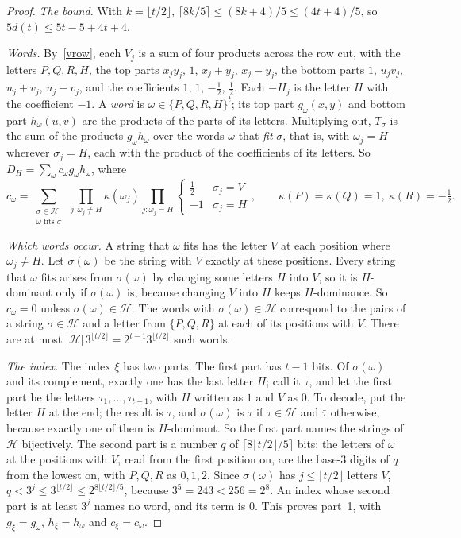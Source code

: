 \documentclass[11pt]{article}
\newcommand{\Hs}{\mathcal H}
\begin{document}
\begin{proof}
\emph{The bound.} With $k=\lfloor t/2\rfloor$, $\lceil8k/5\rceil\le(8k+4)/5\le(4t+4)/5$, so $5d(t)\le5t-5+4t+4$.

\emph{Words.} By~\eqref{vrow}, each $V_j$ is a sum of four products across the row cut, with the letters $P,Q,R,H$, the top parts $x_jy_j$, $1$, $x_j+y_j$, $x_j-y_j$, the bottom parts $1$, $u_jv_j$, $u_j+v_j$, $u_j-v_j$, and the coefficients $1$, $1$, $-\frac12$, $\frac12$. Each $-H_j$ is the letter $H$ with the coefficient $-1$. A \emph{word} is $\omega\in\{P,Q,R,H\}^t$; its top part $g_\omega(x,y)$ and bottom part $h_\omega(u,v)$ are the products of the parts of its letters. Multiplying out, $T_\sigma$ is the sum of the products $g_\omega h_\omega$ over the words $\omega$ that \emph{fit} $\sigma$, that is, with $\omega_j=H$ wherever $\sigma_j=H$, each with the product of the coefficients of its letters. So $D_H=\sum_\omega c_\omega g_\omega h_\omega$, where
\[
c_\omega=\sum_{\substack{\sigma\in\Hs\\\omega\text{ fits }\sigma}}\ \prod_{j:\omega_j\ne H}\kappa(\omega_j)\prod_{j:\omega_j=H}\begin{cases}\frac12&\sigma_j=V\\-1&\sigma_j=H\end{cases},\qquad\kappa(P)=\kappa(Q)=1,\ \kappa(R)=-\tfrac12 .
\]

\emph{Which words occur.} A string that $\omega$ fits has the letter $V$ at each position where $\omega_j\ne H$. Let $\sigma(\omega)$ be the string with $V$ exactly at these positions. Every string that $\omega$ fits arises from $\sigma(\omega)$ by changing some letters $H$ into $V$, so it is $H$-dominant only if $\sigma(\omega)$ is, because changing $V$ into $H$ keeps $H$-dominance. So $c_\omega=0$ unless $\sigma(\omega)\in\Hs$. The words with $\sigma(\omega)\in\Hs$ correspond to the pairs of a string $\sigma\in\Hs$ and a letter from $\{P,Q,R\}$ at each of its positions with $V$. There are at most $|\Hs|\,3^{\lfloor t/2\rfloor}=2^{t-1}3^{\lfloor t/2\rfloor}$ such words.

\emph{The index.} The index $\xi$ has two parts. The first part has $t-1$ bits. Of $\sigma(\omega)$ and its complement, exactly one has the last letter $H$; call it $\tau$, and let the first part be the letters $\tau_1,\dots,\tau_{t-1}$, with $H$ written as $1$ and $V$ as $0$. To decode, put the letter $H$ at the end; the result is $\tau$, and $\sigma(\omega)$ is $\tau$ if $\tau\in\Hs$ and $\bar\tau$ otherwise, because exactly one of them is $H$-dominant. So the first part names the strings of $\Hs$ bijectively. The second part is a number $q$ of $\lceil8\lfloor t/2\rfloor/5\rceil$ bits: the letters of $\omega$ at the positions with $V$, read from the first position on, are the base-$3$ digits of $q$ from the lowest on, with $P,Q,R$ as $0,1,2$. Since $\sigma(\omega)$ has $j\le\lfloor t/2\rfloor$ letters $V$, $q<3^j\le3^{\lfloor t/2\rfloor}\le2^{8\lfloor t/2\rfloor/5}$, because $3^5=243<256=2^8$. An index whose second part is at least $3^j$ names no word, and its term is $0$. This proves part~1, with $g_\xi=g_\omega$, $h_\xi=h_\omega$ and $c_\xi=c_\omega$.


\end{proof}
\end{document}
